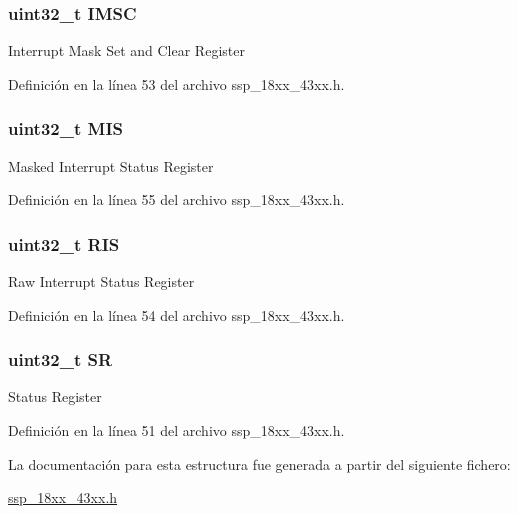 \subsubsection[{\texorpdfstring{I\+M\+SC}{IMSC}}]{ uint32\+\_\+t I\+M\+SC}\hypertarget{struct_l_p_c___s_s_p___t_aadaeb8eaf11a1ac2952008e4f5aea459}{}\label{struct_l_p_c___s_s_p___t_aadaeb8eaf11a1ac2952008e4f5aea459}
Interrupt Mask Set and Clear Register 

Definición en la línea 53 del archivo ssp\+\_\+18xx\+\_\+43xx.\+h.

\subsubsection[{\texorpdfstring{M\+IS}{MIS}}]{ uint32\+\_\+t M\+IS}\hypertarget{struct_l_p_c___s_s_p___t_ab93d8e22f60836895e96cc388310dd90}{}\label{struct_l_p_c___s_s_p___t_ab93d8e22f60836895e96cc388310dd90}
Masked Interrupt Status Register 

Definición en la línea 55 del archivo ssp\+\_\+18xx\+\_\+43xx.\+h.

\subsubsection[{\texorpdfstring{R\+IS}{RIS}}]{ uint32\+\_\+t R\+IS}\hypertarget{struct_l_p_c___s_s_p___t_aef20f9db3bdcf52941c8ac42f14a3c19}{}\label{struct_l_p_c___s_s_p___t_aef20f9db3bdcf52941c8ac42f14a3c19}
Raw Interrupt Status Register 

Definición en la línea 54 del archivo ssp\+\_\+18xx\+\_\+43xx.\+h.

\subsubsection[{\texorpdfstring{SR}{SR}}]{ uint32\+\_\+t SR}\hypertarget{struct_l_p_c___s_s_p___t_aa4e5f09c578d8d5c138b41a1e740df3f}{}\label{struct_l_p_c___s_s_p___t_aa4e5f09c578d8d5c138b41a1e740df3f}
Status Register 

Definición en la línea 51 del archivo ssp\+\_\+18xx\+\_\+43xx.\+h.



La documentación para esta estructura fue generada a partir del siguiente fichero\+:\begin{DoxyCompactItemize}
\item 
\hyperlink{ssp__18xx__43xx_8h}{ssp\+\_\+18xx\+\_\+43xx.\+h}\end{DoxyCompactItemize}
